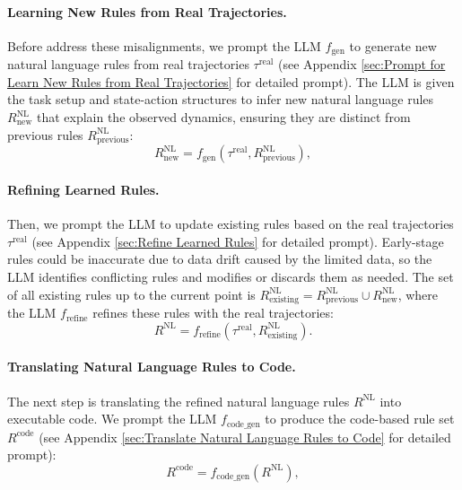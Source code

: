 \documentclass{article} %
\begin{document}
\paragraph{Learning New Rules from Real Trajectories.}
Before address these misalignments, we prompt the LLM $f_{\text{gen}}$ to generate new natural language rules from real trajectories $\tau^{\text{real}}$ (see Appendix \ref{sec:Prompt for Learn New Rules from Real Trajectories} for detailed prompt).
The LLM is given the task setup and state-action structures to infer new natural language rules \( R_{\text{new}}^{\text{NL}} \) that explain the observed dynamics, ensuring they are distinct from previous rules \( R_{\text{previous}}^{\text{NL}} \):
\begin{equation}
    R_{\text{new}}^{\text{NL}} = f_{\text{gen}}(\tau^{\text{real}}, R_{\text{previous}}^{\text{NL}}),
\end{equation}


\paragraph{Refining Learned Rules.}

Then, we prompt the LLM to update existing rules based on the real trajectories $\tau^{\text{real}}$ (see Appendix \ref{sec:Refine Learned Rules} for detailed prompt). Early-stage rules could be inaccurate due to data drift caused by the limited data, so the LLM identifies conflicting rules and modifies or discards them as needed. The set of all existing rules up to the current point is $R_{\text{existing}}^{\text{NL}} = R_{\text{previous}}^{\text{NL}} \cup R_{\text{new}}^{\text{NL}} $, where the LLM $f_{\text{refine}}$ refines these rules with the real trajectories:
\begin{equation}
    R^{\text{NL}} = f_{\text{refine}}(\tau^{\text{real}}, R_{\text{existing}}^{\text{NL}}).
\end{equation}

\paragraph{Translating Natural Language Rules to Code.}
\label{sec:Translating Natural Language Rules to Code}

The next step is translating the refined natural language rules $R^{\text{NL}}$ into executable code. 
We prompt the LLM $f_{\text{code\_gen}}$ to produce the code-based rule set $R^{\text{code}}$   (see Appendix \ref{sec:Translate Natural Language Rules to Code} for detailed prompt):
\begin{equation}
    R^{\text{code}} = f_{\text{code\_gen}}(R^{\text{NL}}),
\end{equation}
\end{document}
